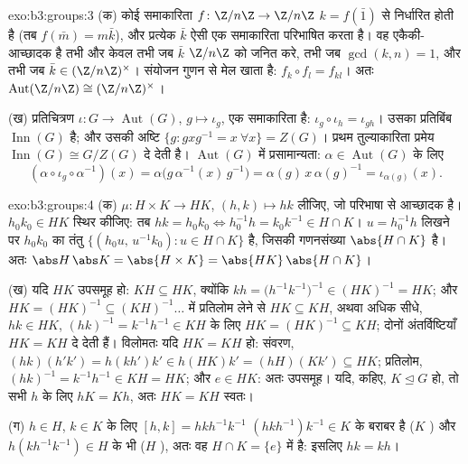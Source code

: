 \begin{solution}{exo:b3:groups:3}
(क) कोई समाकारिता $f \colon \Z/n\Z \to \Z/n\Z$ $k =
f(\bar 1)$ से निर्धारित होती है (तब $f(\bar m) = m\bar k$), और
प्रत्येक $\bar k$ ऐसी एक समाकारिता परिभाषित करता है। वह एकैकी-आच्छादक
है तभी और केवल तभी जब $\bar k$ $\Z/n\Z$ को जनित करे, तभी जब $\gcd(k,n) = 1$, और तभी
जब $\bar k \in (\Z/n\Z)^\times$। संयोजन गुणन से मेल खाता है: $f_k \circ f_l = f_{kl}$। अतः $\operatorname{Aut}(\Z/n\Z) \cong (\Z/n\Z)^\times$।

(ख) प्रतिचित्रण $\iota\colon G \to \operatorname{Aut}(G)$, $g \mapsto
\iota_g$, एक समाकारिता है: $\iota_g \circ \iota_h = \iota_{gh}$। उसका प्रतिबिंब
$\operatorname{Inn}(G)$ है; और उसकी अष्टि $\{g : gxg^{-1} =
x\ \forall x\} = Z(G)$। प्रथम तुल्याकारिता प्रमेय $\operatorname{Inn}(G) \cong G/Z(G)$ दे देती
है। $\operatorname{Aut}(G)$ में प्रसामान्यता: $\alpha \in \operatorname{Aut}(G)$ के लिए
\[
(\alpha \circ \iota_g \circ \alpha^{-1})(x)
= \alpha\bigl(g\,\alpha^{-1}(x)\,g^{-1}\bigr)
= \alpha(g)\, x\, \alpha(g)^{-1} = \iota_{\alpha(g)}(x).
\]
\end{solution}

\begin{solution}{exo:b3:groups:4}
(क) $\mu \colon H \times K \to HK$, $(h,k) \mapsto hk$ लीजिए, जो परिभाषा से आच्छादक है। $h_0k_0 \in HK$ स्थिर कीजिए:
तब $hk = h_0k_0
\iff h_0^{-1}h = k_0 k^{-1} \in H \cap K$। $u =
h_0^{-1}h$ लिखने पर $h_0k_0$ का तंतु $\{(h_0u,\, u^{-1}k_0) : u
\in H \cap K\}$ है, जिसकी गणनसंख्या $\abs{H \cap K}$
है। अतः $\abs
H\,\abs K = \abs{H\times K} = \abs{HK}\,\abs{H \cap K}$।

(ख) यदि $HK$ उपसमूह हो: $KH \subseteq HK$, क्योंकि $kh =
\bigl(h^{-1}k^{-1}\bigr)^{-1} \in (HK)^{-1} = HK$; और $HK = (HK)^{-1} \subseteq
(KH)^{-1}\dots$ में प्रतिलोम
लेने से $HK
\subseteq KH$, अथवा अधिक सीधे, $hk \in HK$, $(hk)^{-1} =
k^{-1}h^{-1} \in KH$ के लिए $HK = (HK)^{-1} \subseteq KH$; दोनों
अंतर्विष्टियाँ $HK = KH$ दे देती हैं। विलोमतः यदि $HK = KH$ हो: संवरण, $(hk)(h'k') = h(kh')k' \in h(HK)k' = (hH)(Kk') \subseteq HK$;
प्रतिलोम, $(hk)^{-1} = k^{-1}h^{-1} \in KH = HK$; और $e \in HK$: अतः उपसमूह। यदि, कहिए, $K \trianglelefteq G$ हो, तो सभी
$h$ के लिए $hK = Kh$, अतः $HK = KH$ स्वतः।

(ग) $h \in H$, $k \in K$ के लिए  $[h,k] = hkh^{-1}
k^{-1}$ $(hkh^{-1})k^{-1} \in K$ के बराबर है ($K$
) और $h(kh^{-1}k^{-1}) \in H$ के भी ($H$ ), अतः वह $H \cap K =
\{e\}$ में है:
इसलिए $hk = kh$।
\end{solution}

